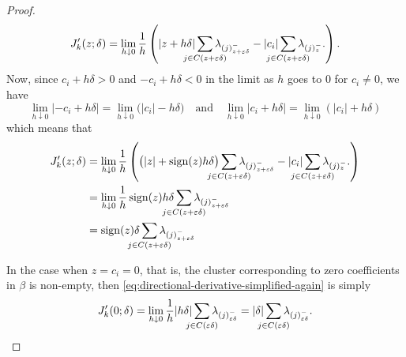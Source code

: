 \begin{proof}
\begin{equation}
    \label{eq:directional-derivative-simplified-again}
    J'_k(z; \delta)
    = \lim_{h \downarrow 0} \frac{1}{h}
    \left(
      |z + h\delta|\smashoperator{\sum_{j \in C(z + \varepsilon\delta)}} \lambda_{(j)^-_{z + \varepsilon\delta}}
      - |c_i| \smashoperator{\sum_{j \in C(z + \varepsilon\delta)}} \lambda_{(j)^-_{z}}.
    \right).
  \end{equation}
  Now, since \(c_i + h \delta > 0\) and \(-c_i + h \delta < 0\) in the limit as
  \(h\) goes to \(0\) for \(c_i \neq 0\), we have
  \[
    \lim_{h\downarrow 0} |-c_i + h \delta|
    = \lim_{h\downarrow 0}\big( |c_i| -h \delta\big)
    \quad\text{and}\quad
    \lim_{h\downarrow 0} |c_i + h \delta|
    = \lim_{h\downarrow 0}(|c_i| + h \delta)
  \]
  which means that
  \begin{align*}
    J'_k(z; \delta)
     & = \lim_{h \downarrow 0} \frac{1}{h}
    \left(
      \big(|z| + \sign(z)h\delta\big)\smashoperator{\sum_{j \in C(z + \varepsilon\delta)}} \lambda_{(j)^-_{z + \varepsilon\delta}}
      - |c_i| \smashoperator{\sum_{j \in C(z + \varepsilon\delta)}} \lambda_{(j)^-_{z}}.
    \right)                                                                                                          \\
     & = \lim_{h \downarrow 0} \frac{1}{h}
    \sign(z)h\delta\smashoperator{\sum_{j \in C(z + \varepsilon\delta)}} \lambda_{(j)^-_{z + \varepsilon\delta}}     \\
     & = \sign(z)\delta\smashoperator{\sum_{j \in C(z + \varepsilon\delta)}} \lambda_{(j)^-_{z + \varepsilon\delta}} \\
  \end{align*}

  In the case when \(z = c_i = 0\), that is, the cluster corresponding to
  zero coefficients in \(\beta\) is non-empty,
  then \eqref{eq:directional-derivative-simplified-again} is
  simply
  \begin{equation*}
    \label{eq:directional-derivative-zerocase}
    J'_k(0; \delta)
    = \lim_{h \downarrow 0} \frac{1}{h}
    |h\delta|\smashoperator{\sum_{j \in C(\varepsilon\delta)}} \lambda_{(j)^-_{\varepsilon\delta}}
    = |\delta|\smashoperator{\sum_{j \in C(\varepsilon\delta)}} \lambda_{(j)^-_{\varepsilon\delta}}.
  \end{equation*}


\end{proof}
